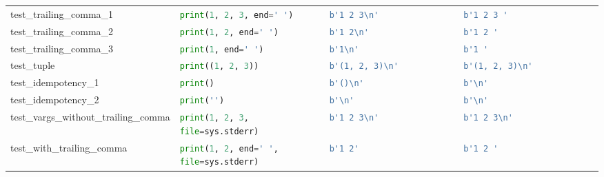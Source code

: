 \begin{table}[]
\begin{tabular}{@{}l|llll@{}}
    test\_trailing\_comma\_1              & \lstinline[language=Python, style=pythonstyle]|print(1, 2, 3, end=' ')              | & \lstinline[language=Python, style=pythonstyle]|b'1 2 3\n'             | & \lstinline[language=Python, style=pythonstyle]|b'1 2 3 '                             | \\ 
    test\_trailing\_comma\_2              & \lstinline[language=Python, style=pythonstyle]|print(1, 2, end=' ')                 | & \lstinline[language=Python, style=pythonstyle]|b'1 2\n'               | & \lstinline[language=Python, style=pythonstyle]|b'1 2 '                               | \\ 
    test\_trailing\_comma\_3              & \lstinline[language=Python, style=pythonstyle]|print(1, end=' ')                    | & \lstinline[language=Python, style=pythonstyle]|b'1\n'                 | & \lstinline[language=Python, style=pythonstyle]|b'1 '                                 | \\ 
    test\_tuple                           & \lstinline[language=Python, style=pythonstyle]|print((1, 2, 3))                     | & \lstinline[language=Python, style=pythonstyle]|b'(1, 2, 3)\n'         | & \lstinline[language=Python, style=pythonstyle]|b'(1, 2, 3)\n'         | \\ 
    test\_idempotency\_1                  & \lstinline[language=Python, style=pythonstyle]|print()                              | & \lstinline[language=Python, style=pythonstyle]|b'()\n'                | & \lstinline[language=Python, style=pythonstyle]|b'\n'                  | \\ 
    test\_idempotency\_2                  & \lstinline[language=Python, style=pythonstyle]|print('')                            | & \lstinline[language=Python, style=pythonstyle]|b'\n'                  | & \lstinline[language=Python, style=pythonstyle]|b'\n'                  | \\ 
    test\_vargs\_without\_trailing\_comma & \lstinline[language=Python, style=pythonstyle]|print(1, 2, 3, file=sys.stderr)      | & \lstinline[language=Python, style=pythonstyle]|b'1 2 3\n'             | & \lstinline[language=Python, style=pythonstyle]|b'1 2 3\n'             | \\ 
    test\_with\_trailing\_comma           & \lstinline[language=Python, style=pythonstyle]|print(1, 2, end=' ', file=sys.stderr)| & \lstinline[language=Python, style=pythonstyle]|b'1 2'                                | & \lstinline[language=Python, style=pythonstyle]|b'1 2 '                               | \\ 

\end{tabular}
\end{table}
